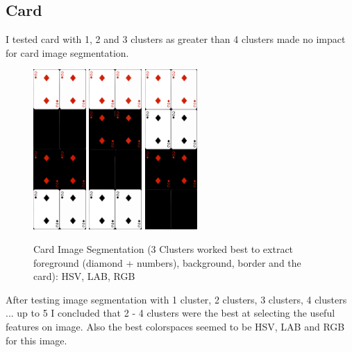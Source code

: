 \documentclass[conference]{IEEEtran}
\begin{document}
\subsection{Card}
I tested card with 1, 2 and 3 clusters as greater than 4 clusters made no impact for card image segmentation.
\begin{figure}[H]
    \centerline{
        {\includegraphics[width=20mm, scale=0.5]{./figures/task 4/card/3 clusters HSV.png}}
        {\includegraphics[width=20mm, scale=0.5]{./figures/task 4/card/3 clusters LAB.png}}
        {\includegraphics[width=20mm, scale=0.5]{./figures/task 4/card/3 clusters RGB.png}}
    }
    \caption{Card Image Segmentation (3 Clusters worked best to extract foreground (diamond + numbers), background, border and the card): HSV, LAB, RGB}
    \label{fig}
\end{figure}
After testing image segmentation with 1 cluster, 2 clusters, 3 clusters, 4 clusters ... up to 5 I concluded that 2 - 4 clusters were
the best at selecting the useful features on image. Also the best colorspaces seemed to be HSV, LAB and RGB for this image.
\end{document}
